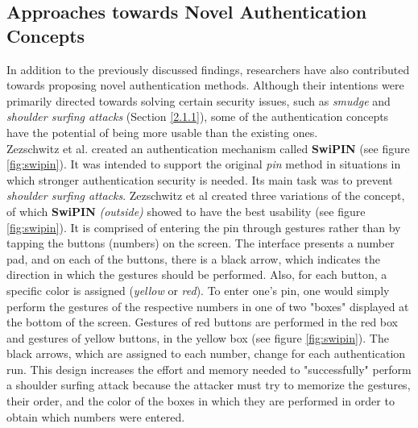 \subsection{Approaches towards Novel Authentication Concepts} \label{2.2.3}

In addition to the previously discussed findings, researchers have also contributed towards proposing novel authentication methods. Although their intentions were primarily directed towards solving certain security issues, such as \textit{smudge} and \textit{shoulder surfing attacks} (Section \ref{2.1.1}), some of the authentication concepts have the potential of being more usable than the existing ones.\\

Zezschwitz et al. \cite{Swipin} created an authentication mechanism called \textbf{SwiPIN} (see figure \ref{fig:swipin}). It was intended to support the original \textit{pin} method in situations in which stronger authentication security is needed. Its main task was to prevent \textit{shoulder surfing attacks}. Zezschwitz et al \cite{Swipin} created three variations of the concept, of which \textbf{SwiPIN} \textit{(outside)} showed to have the best usability (see figure \ref{fig:swipin}). It is comprised of entering the pin through gestures rather than by tapping the buttons (numbers) on the screen. The interface presents a number pad, and on each of the buttons, there is a black arrow, which indicates the direction in which the gestures should be performed. Also, for each button, a specific color is assigned (\textit{yellow} or \textit{red}). To enter one's pin, one would simply perform the gestures of the respective numbers in one of two "boxes" displayed at the bottom of the screen. Gestures of red buttons are performed in the red box and gestures of yellow buttons, in the yellow box (see figure \ref{fig:swipin}). The black arrows, which are assigned to each number, change for each authentication run. This design increases the effort and memory needed to "successfully" perform a shoulder surfing attack because the attacker must try to memorize the gestures, their order, and the color of the boxes in which they are performed in order to obtain which numbers were entered. \\

